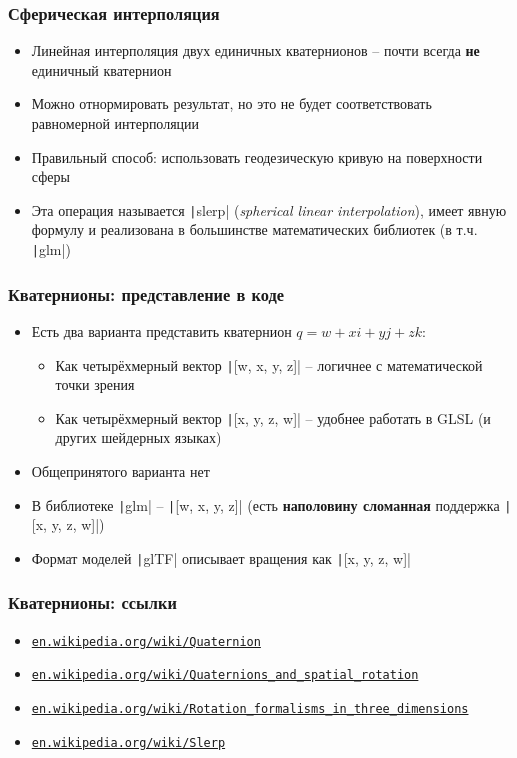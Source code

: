 \documentclass[10pt]{beamer}
\begin{document}
\begin{frame}[fragile]
\frametitle{Сферическая интерполяция}
\begin{itemize}
\item Линейная интерполяция двух единичных кватернионов -- почти всегда \textbf{не} единичный кватернион
\pause
\item Можно отнормировать результат, но это не будет соответствовать равномерной интерполяции
\pause
\item Правильный способ: использовать геодезическую кривую на поверхности сферы
\pause
\item Эта операция называется \texttt|slerp| (\textit{spherical linear interpolation}), имеет явную формулу и реализована в большинстве математических библиотек (в т.ч. \texttt|glm|)
\end{itemize}
\end{frame}

\begin{frame}[fragile]
\frametitle{Кватернионы: представление в коде}
\begin{itemize}
\item Есть два варианта представить кватернион \begin{math}q = w + xi + yj + zk\end{math}:
\pause
\begin{itemize}
\item Как четырёхмерный вектор \texttt|[w, x, y, z]| -- логичнее с математической точки зрения
\item Как четырёхмерный вектор \texttt|[x, y, z, w]| -- удобнее работать в GLSL (и других шейдерных языках)
\end{itemize}
\pause
\item Общепринятого варианта нет
\item В библиотеке \texttt|glm| -- \texttt|[w, x, y, z]| (есть \alert{\textbf{наполовину сломанная}} поддержка \texttt|[x, y, z, w]|)
\item Формат моделей \texttt|glTF| описывает вращения как \texttt|[x, y, z, w]|
\end{itemize}
\end{frame}

\begin{frame}[fragile]
\frametitle{Кватернионы: ссылки}
\begin{itemize}
\item \href{https://en.wikipedia.org/wiki/Quaternion}{\texttt{en.wikipedia.org/wiki/Quaternion}}
\item \href{https://en.wikipedia.org/wiki/Quaternions_and_spatial_rotation}{\texttt{en.wikipedia.org/wiki/Quaternions\_and\_spatial\_rotation}}
\item \href{https://en.wikipedia.org/wiki/Rotation_formalisms_in_three_dimensions}{\texttt{en.wikipedia.org/wiki/Rotation\_formalisms\_in\_three\_dimensions}}
\item \href{https://en.wikipedia.org/wiki/Slerp}{\texttt{en.wikipedia.org/wiki/Slerp}}
\end{itemize}
\end{frame}
\end{document}
